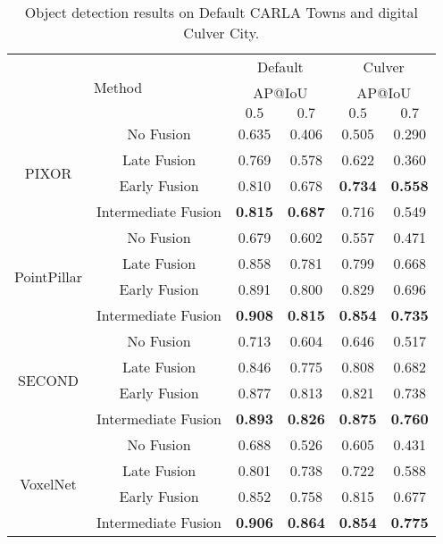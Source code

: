 \begin{table}[]
    \centering
    \caption{Object detection results on Default CARLA Towns and digital Culver City.}
    \begin{tabular}{c|c|cc|cc}
        \toprule
        \multicolumn{2}{c|}{\multirow{3}{*}{Method}}&\multicolumn{2}{c|}{Default}&\multicolumn{2}{c}{Culver}\\
        \multicolumn{2}{c|}{}&\multicolumn{2}{c|}{AP@IoU}&\multicolumn{2}{c}{AP@IoU}\\
         \multicolumn{2}{c|}{}&$0.5$&$0.7$&$0.5$&$0.7$ \\
         \hline
        \multirow{4}{*}{PIXOR}&No Fusion&0.635 &0.406 &0.505&0.290\\
        &Late Fusion&0.769&0.578&0.622&0.360\\
        &Early Fusion&0.810&0.678&\textbf{0.734}&\textbf{0.558}\\
        &Intermediate Fusion&\textbf{0.815}&\textbf{0.687}&0.716&0.549\\
        \hline
        \multirow{4}{*}{PointPillar}&No Fusion&0.679&0.602&0.557&0.471\\
        &Late Fusion&0.858&0.781&0.799&0.668\\
        &Early Fusion&0.891&0.800&0.829&0.696\\
        &Intermediate Fusion&\textbf{0.908}&\textbf{0.815}&\textbf{0.854}&\textbf{0.735}\\
        \hline
        \multirow{4}{*}{SECOND}&No Fusion&0.713&0.604&0.646&0.517\\
        &Late Fusion&0.846&0.775&0.808&0.682\\
        &Early Fusion&0.877&0.813&0.821&0.738\\
        &Intermediate Fusion&\textbf{0.893}&\textbf{0.826}&\textbf{0.875} &\textbf{0.760}\\
        \hline
        \multirow{4}{*}{VoxelNet}&No Fusion&0.688&0.526&0.605&0.431\\
        &Late Fusion&0.801&0.738&0.722&0.588\\
        &Early Fusion&0.852&0.758&0.815&0.677\\
        &Intermediate Fusion&\textbf{0.906}&\textbf{0.864}&\textbf{0.854}&\textbf{0.775}\\
        \bottomrule
    \end{tabular}
    \label{table:benchmark_analysis}
\end{table}

